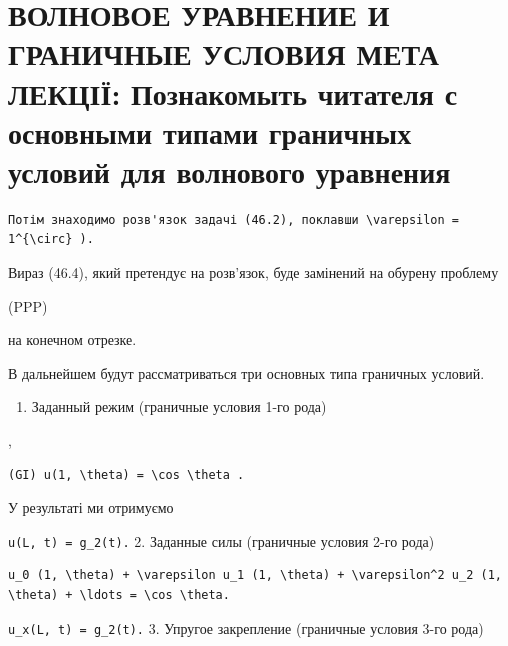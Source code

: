\documentclass[
  ukrainian,
]{article}
\providecommand{\tightlist}{%
  \setlength{\itemsep}{0pt}\setlength{\parskip}{0pt}}
\begin{document}
\section{ВОЛНОВОЕ УРАВНЕНИЕ И ГРАНИЧНЫЕ УСЛОВИЯ МЕТА ЛЕКЦІЇ: Познакомыть
читателя с основными типами граничных условий для волнового
уравнения}\label{ux432ux43eux43bux43dux43eux432ux43eux435-ux443ux440ux430ux432ux43dux435ux43dux438ux435-ux438-ux433ux440ux430ux43dux438ux447ux43dux44bux435-ux443ux441ux43bux43eux432ux438ux44f-ux43cux435ux442ux430-ux43bux435ux43aux446ux456ux457-ux43fux43eux437ux43dux430ux43aux43eux43cux44bux442ux44c-ux447ux438ux442ux430ux442ux435ux43bux44f-ux441-ux43eux441ux43dux43eux432ux43dux44bux43cux438-ux442ux438ux43fux430ux43cux438-ux433ux440ux430ux43dux438ux447ux43dux44bux445-ux443ux441ux43bux43eux432ux438ux439-ux434ux43bux44f-ux432ux43eux43bux43dux43eux432ux43eux433ux43e-ux443ux440ux430ux432ux43dux435ux43dux438ux44f}

\begin{verbatim}
Потім знаходимо розв'язок задачі (46.2), поклавши \varepsilon = 1^{\circ} ).
\end{verbatim}

Вираз (46.4), який претендує на розв'язок, буде замінений на обурену
проблему

(PPP)

на конечном отрезке.

В дальнейшем будут рассматриваться три основных типа граничных условий.

\begin{enumerate}
\def\labelenumi{\arabic{enumi}.}
\tightlist
\item
  Заданный режим (граничные условия 1-го рода)
\end{enumerate}

,

\begin{verbatim}
(GI) u(1, \theta) = \cos \theta .
\end{verbatim}

У результаті ми отримуємо

\texttt{u(L,\ t)\ =\ g\_2(t).} 2. Заданные силы (граничные условия 2-го
рода)

\begin{verbatim}
u_0 (1, \theta) + \varepsilon u_1 (1, \theta) + \varepsilon^2 u_2 (1, \theta) + \ldots = \cos \theta.
\end{verbatim}

\texttt{u\_x(L,\ t)\ =\ g\_2(t).} 3. Упругое закрепление (граничные
условия 3-го рода)
\end{document}
